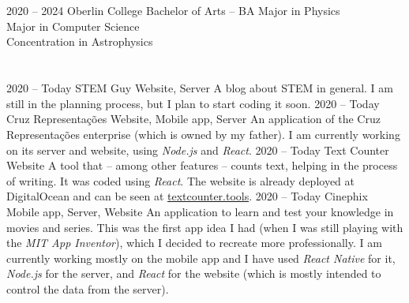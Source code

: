 \documentclass{cv}
\begin{document}
    \section*{}
        \begin{entrylist}
            \entry
                {2020 -- 2024}
                {Oberlin College}
                {Bachelor of Arts -- BA}
                {Major in Physics\\ Major in Computer Science\\ Concentration in Astrophysics}
        \end{entrylist}
    \section*{}
        \begin{entrylist}
            \entry
                {2020 -- Today}
                {STEM Guy}
                {Website, Server}
                {A blog about STEM in general. I am still in the planning process, but I plan to start coding it soon.}
            \entry
                {2020 -- Today}
                {Cruz Representações}
                {Website, Mobile app, Server}
                {An application of the Cruz Representações enterprise (which is owned by my father). I am currently working on its server and website, using \textit{Node.js} and \textit{React}.}
            \entry
                {2020 -- Today}
                {Text Counter}
                {Website}
                {A tool that -- among other features -- counts text, helping in the process of writing. It was coded using \textit{React}. The website is already deployed at DigitalOcean and can be seen at \href{https://textcounter.tools/}{textcounter.tools}.}
            \entry
                {2020 -- Today}
                {Cinephix}
                {Mobile app, Server, Website}
                {An application to learn and test your knowledge in movies and series. This was the first app idea I had (when I was still playing with the \textit{MIT App Inventor}), which I decided to recreate more professionally. I am currently working mostly on the mobile app and I have used \textit{React Native} for it, \textit{Node.js} for the server, and \textit{React} for the website (which is mostly intended to control the data from the server).}
        \end{entrylist}
\end{document}

